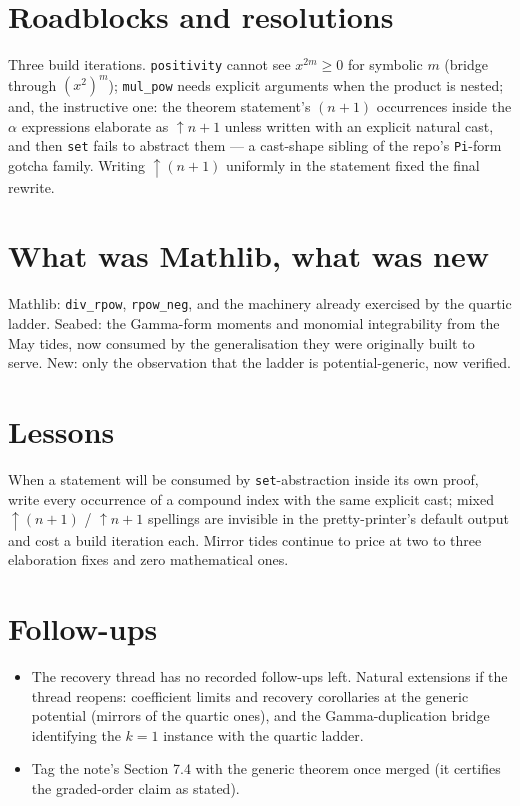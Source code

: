 \documentclass[11pt]{article}
\begin{document}
\section{Roadblocks and resolutions}

Three build iterations. \texttt{positivity} cannot see
$x^{2m} \geq 0$ for symbolic $m$ (bridge through $(x^2)^m$);
\texttt{mul\_pow} needs explicit arguments when the product is nested;
and, the instructive one: the theorem statement's $(n+1)$ occurrences
inside the $\alpha$ expressions elaborate as $\uparrow\!n + 1$ unless
written with an explicit natural cast, and then \texttt{set} fails to
abstract them --- a cast-shape sibling of the repo's \texttt{Pi}-form
gotcha family. Writing $\uparrow\!(n+1)$ uniformly in the statement
fixed the final rewrite.

\section{What was Mathlib, what was new}

Mathlib: \texttt{div\_rpow}, \texttt{rpow\_neg}, and the machinery
already exercised by the quartic ladder. Seabed: the Gamma-form moments
and monomial integrability from the May tides, now consumed by the
generalisation they were originally built to serve. New: only the
observation that the ladder is potential-generic, now verified.

\section{Lessons}

When a statement will be consumed by \texttt{set}-abstraction inside its
own proof, write every occurrence of a compound index with the same
explicit cast; mixed $\uparrow\!(n+1)$ / $\uparrow\!n + 1$ spellings are
invisible in the pretty-printer's default output and cost a build
iteration each. Mirror tides continue to price at two to three
elaboration fixes and zero mathematical ones.

\section{Follow-ups}

\begin{itemize}
\item The recovery thread has no recorded follow-ups left. Natural
extensions if the thread reopens: coefficient limits and recovery
corollaries at the generic potential (mirrors of the quartic ones), and
the Gamma-duplication bridge identifying the $k = 1$ instance with the
quartic ladder.
\item Tag the note's Section 7.4 with the generic theorem once merged
(it certifies the graded-order claim as stated).
\end{itemize}
\end{document}
